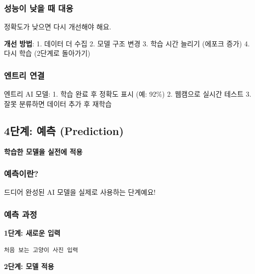 \documentclass[a4paper, 11pt]{article}
\renewenvironment{quote}
  {\begin{tcolorbox}[colback=lightblue!30, colframe=mainblue!50,
   left=8pt, right=8pt, top=4pt, bottom=4pt, breakable]}
  {\end{tcolorbox}}
\begin{document}
\hypertarget{uxc131uxb2a5uxc774-uxb0aeuxc744-uxb54c-uxb300uxc751}{%
\subsubsection{성능이 낮을 때
대응}\label{uxc131uxb2a5uxc774-uxb0aeuxc744-uxb54c-uxb300uxc751}}

정확도가 낮으면 다시 개선해야 해요.

\textbf{개선 방법}: 1. 데이터 더 수집 2. 모델 구조 변경 3. 학습 시간
늘리기 (에포크 증가) 4. 다시 학습 (2단계로 돌아가기)

\hypertarget{uxc5d4uxd2b8uxb9ac-uxc5f0uxacb0-2}{%
\subsubsection{엔트리 연결}\label{uxc5d4uxd2b8uxb9ac-uxc5f0uxacb0-2}}

엔트리 AI 모델: 1. 학습 완료 후 정확도 표시 (예: 92\%) 2. 웹캠으로
실시간 테스트 3. 잘못 분류하면 데이터 추가 후 재학습

\hypertarget{uxb2e8uxacc4-uxc608uxce21-prediction}{%
\subsection{4단계: 예측
(Prediction)}\label{uxb2e8uxacc4-uxc608uxce21-prediction}}

\begin{quote}
\textbf{학습한 모델을 실전에 적용}
\end{quote}

\hypertarget{uxc608uxce21uxc774uxb780}{%
\subsubsection{예측이란?}\label{uxc608uxce21uxc774uxb780}}

드디어 완성된 AI 모델을 실제로 사용하는 단계예요!

\hypertarget{uxc608uxce21-uxacfcuxc815}{%
\subsubsection{예측 과정}\label{uxc608uxce21-uxacfcuxc815}}

\textbf{1단계: 새로운 입력}

\begin{verbatim}
처음 보는 고양이 사진 입력
\end{verbatim}

\textbf{2단계: 모델 적용}
\end{document}
